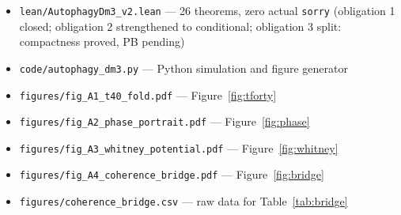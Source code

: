 \documentclass[12pt,a4paper]{article}
\begin{document}
\begin{itemize}[leftmargin=2em, itemsep=1pt]
  \item \texttt{lean/AutophagyDm3\_v2.lean} --- 26 theorems, zero actual \texttt{sorry}
          (obligation 1 closed; obligation 2 strengthened to conditional; 
          obligation 3 split: compactness proved, PB pending)
  \item \texttt{code/autophagy\_dm3.py} --- Python simulation and figure generator
  \item \texttt{figures/fig\_A1\_t40\_fold.pdf} --- Figure~\ref{fig:tforty}
  \item \texttt{figures/fig\_A2\_phase\_portrait.pdf} --- Figure~\ref{fig:phase}
  \item \texttt{figures/fig\_A3\_whitney\_potential.pdf} --- Figure~\ref{fig:whitney}
  \item \texttt{figures/fig\_A4\_coherence\_bridge.pdf} --- Figure~\ref{fig:bridge}
  \item \texttt{figures/coherence\_bridge.csv} --- raw data for Table~\ref{tab:bridge}
\end{itemize}
\end{document}
